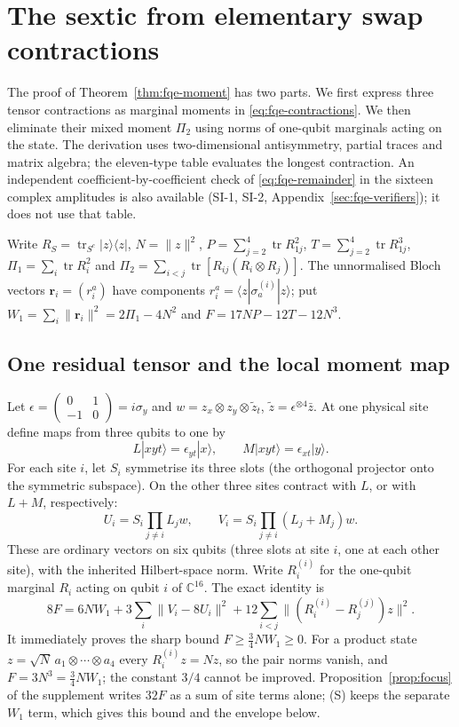 \section{The sextic from elementary swap contractions}\label{sec:fqe-sextic}

The proof of Theorem~\ref{thm:fqe-moment} has two parts. We first express three tensor contractions as marginal
moments in \eqref{eq:fqe-contractions}. We then eliminate their mixed moment $\Pi_2$ using norms of one-qubit
marginals acting on the state. The derivation uses two-dimensional antisymmetry, partial traces and matrix algebra;
the eleven-type table evaluates the longest contraction. An independent coefficient-by-coefficient check of
\eqref{eq:fqe-remainder} in the sixteen complex amplitudes is also available (SI-1, SI-2,
Appendix~\ref{sec:fqe-verifiers}); it does not use that table.

Write \(R_S=\operatorname{tr}_{S^c}|z\rangle\langle z|\), \(N=\|z\|^2\),
\(P=\sum_{j=2}^4\operatorname{tr}R_{1j}^2\), \(T=\sum_{j=2}^4\operatorname{tr}R_{1j}^3\),
\(\Pi_1=\sum_i\operatorname{tr}R_i^2\) and \(\Pi_2=\sum_{i<j}\operatorname{tr}[R_{ij}(R_i\otimes
R_j)]\). The unnormalised Bloch vectors \(\mathbf r_i=(r_i^a)\) have components \(r_i^a=\langle
z|\sigma_a^{(i)}|z\rangle\); put \(W_1=\sum_i\|\mathbf r_i\|^2=2\Pi_1-4N^2\) and \(F=17NP-12T-12N^3\).

\subsection{One residual tensor and the local moment
map}\label{sec:fqe-sextic_identity-one-residual-tensor-and-the-local-moment-map}

Let \(\epsilon=\begin{pmatrix}0&1\\-1&0\end{pmatrix}=i\sigma_y\) and \(w=z_x\otimes z_y\otimes\tilde z_t\), \(\tilde z=\epsilon^{\otimes4}\bar z\). At one physical site define maps from three qubits to one by \[
L|xyt\rangle=\epsilon_{yt}|x\rangle,\qquad
M|xyt\rangle=\epsilon_{xt}|y\rangle.
\] For each site \(i\), let \(S_i\) symmetrise its three slots (the orthogonal projector onto the symmetric subspace). On the other three sites contract
with \(L\), or with \(L+M\), respectively: \[
U_i=S_i\!\prod_{j\ne i}L_jw,\qquad
V_i=S_i\!\prod_{j\ne i}(L_j+M_j)w.
\] These are ordinary vectors on six qubits (three slots at site \(i\), one at each other site), with the inherited
Hilbert-space norm. Write \(R_i^{(i)}\) for the one-qubit marginal
\(R_i\) acting on qubit \(i\) of \(\mathbb C^{16}\). The exact identity is \[
\boxed{\quad8F=6NW_1+3\sum_i\|V_i-8U_i\|^2+12\sum_{i<j}\bigl\|(R_i^{(i)}-R_j^{(j)})z\bigr\|^2.\quad} \tag{S}
\] It immediately proves the sharp bound \(F\ge\tfrac34NW_1\ge0\). For a product state
\(z=\sqrt N\,a_1\otimes\cdots\otimes a_4\) every \(R_i^{(i)}z=Nz\), so the pair norms vanish, and \(F=3N^3=\tfrac34NW_1\);
the constant \(3/4\) cannot be improved. Proposition~\ref{prop:focus} of the supplement writes \(32F\) as a sum of
site terms alone; (S) keeps the separate \(W_1\) term, which gives this bound and the envelope below.

